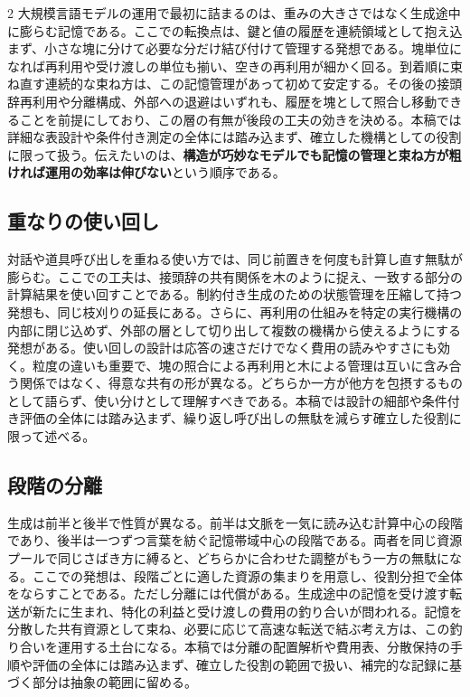 \documentclass[lualatex,a4paper,10pt]{jlreq}
\begin{document}
\begin{multicols}{2}
\raggedcolumns
大規模言語モデルの運用で最初に詰まるのは、重みの大きさではなく生成途中に膨らむ記憶である。ここでの転換点は、鍵と値の履歴を連続領域として抱え込まず、小さな塊に分けて必要な分だけ結び付けて管理する発想である\autocite{pagedattn}。塊単位になれば再利用や受け渡しの単位も揃い、空きの再利用が細かく回る。到着順に束ね直す連続的な束ね方は、この記憶管理があって初めて安定する。その後の接頭辞再利用や分離構成、外部への退避はいずれも、履歴を塊として照合し移動できることを前提にしており、この層の有無が後段の工夫の効きを決める。本稿では詳細な表設計や条件付き測定の全体には踏み込まず、確立した機構としての役割に限って扱う。伝えたいのは、\textbf{構造が巧妙なモデルでも記憶の管理と束ね方が粗ければ運用の効率は伸びない}という順序である。

\subsection{重なりの使い回し}
対話や道具呼び出しを重ねる使い方では、同じ前置きを何度も計算し直す無駄が膨らむ。ここでの工夫は、接頭辞の共有関係を木のように捉え、一致する部分の計算結果を使い回すことである\autocite{sglang}。制約付き生成のための状態管理を圧縮して持つ発想も、同じ枝刈りの延長にある。さらに、再利用の仕組みを特定の実行機構の内部に閉じ込めず、外部の層として切り出して複数の機構から使えるようにする発想がある\autocite{lmcache}。使い回しの設計は応答の速さだけでなく費用の読みやすさにも効く。粒度の違いも重要で、塊の照合による再利用と木による管理は互いに含み合う関係ではなく、得意な共有の形が異なる。どちらか一方が他方を包摂するものとして語らず、使い分けとして理解すべきである。本稿では設計の細部や条件付き評価の全体には踏み込まず、繰り返し呼び出しの無駄を減らす確立した役割に限って述べる。

\subsection{段階の分離}
生成は前半と後半で性質が異なる。前半は文脈を一気に読み込む計算中心の段階であり、後半は一つずつ言葉を紡ぐ記憶帯域中心の段階である。両者を同じ資源プールで同じさばき方に縛ると、どちらかに合わせた調整がもう一方の無駄になる。ここでの発想は、段階ごとに適した資源の集まりを用意し、役割分担で全体をならすことである\autocite{splitwise}。ただし分離には代償がある。生成途中の記憶を受け渡す転送が新たに生まれ、特化の利益と受け渡しの費用の釣り合いが問われる。記憶を分散した共有資源として束ね、必要に応じて高速な転送で結ぶ考え方は、この釣り合いを運用する土台になる\autocite{mooncake}。本稿では分離の配置解析や費用表、分散保持の手順や評価の全体には踏み込まず、確立した役割の範囲で扱い、補完的な記録に基づく部分は抽象の範囲に留める。


\end{multicols}
\end{document}

